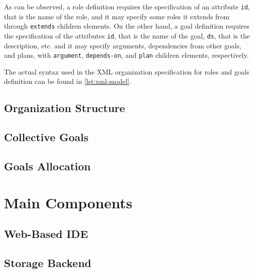 As can be observed, a role definition requires the specification of an attribute \texttt{id}, that is the name of the role, and it may specify some roles it extends from through \texttt{extends} children elements.
On the other hand, a goal definition requires the specification of the attributes \texttt{id}, that is the name of the goal, \texttt{ds}, that is the description, etc. and it may specify arguments, dependencies from other goals, and plans, with \texttt{argument}, \texttt{depends-on}, and \texttt{plan} children elements, respectively.

The actual syntax used in the XML organization specification for roles and goals definition can be found in \cref{lst:xml-model}.

\begin{figure}[H]
    
\end{figure}

\begin{figure}[H]
    
\end{figure}

\subsection{Organization Structure}
\subsection{Collective Goals}
\subsection{Goals Allocation}

\section{Main Components}
\subsection{Web-Based IDE}
\subsection{Storage Backend}
